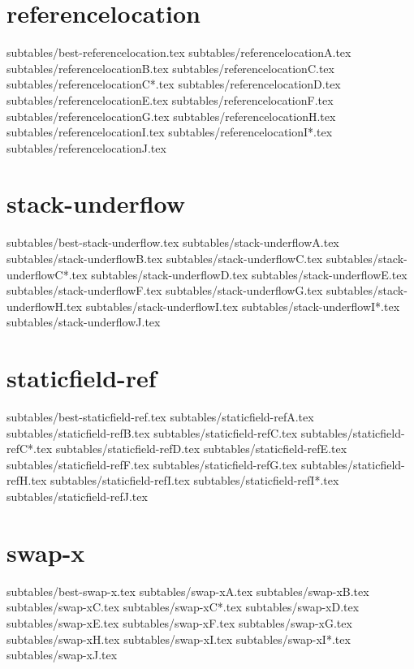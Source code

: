 \section{referencelocation}
    {subtables/best-referencelocation.tex}
    {subtables/referencelocationA.tex}
    {subtables/referencelocationB.tex}
    {subtables/referencelocationC.tex}
    {subtables/referencelocationC*.tex}
    {subtables/referencelocationD.tex}
    {subtables/referencelocationE.tex}
    {subtables/referencelocationF.tex}
    {subtables/referencelocationG.tex}
    {subtables/referencelocationH.tex}
    {subtables/referencelocationI.tex}
    {subtables/referencelocationI*.tex}
    {subtables/referencelocationJ.tex}
\newpage
\section{stack-underflow}
    {subtables/best-stack-underflow.tex}
    {subtables/stack-underflowA.tex}
    {subtables/stack-underflowB.tex}
    {subtables/stack-underflowC.tex}
    {subtables/stack-underflowC*.tex}
    {subtables/stack-underflowD.tex}
    {subtables/stack-underflowE.tex}
    {subtables/stack-underflowF.tex}
    {subtables/stack-underflowG.tex}
    {subtables/stack-underflowH.tex}
    {subtables/stack-underflowI.tex}
    {subtables/stack-underflowI*.tex}
    {subtables/stack-underflowJ.tex}
\newpage
\section{staticfield-ref}
    {subtables/best-staticfield-ref.tex}
    {subtables/staticfield-refA.tex}
    {subtables/staticfield-refB.tex}
    {subtables/staticfield-refC.tex}
    {subtables/staticfield-refC*.tex}
    {subtables/staticfield-refD.tex}
    {subtables/staticfield-refE.tex}
    {subtables/staticfield-refF.tex}
    {subtables/staticfield-refG.tex}
    {subtables/staticfield-refH.tex}
    {subtables/staticfield-refI.tex}
    {subtables/staticfield-refI*.tex}
    {subtables/staticfield-refJ.tex}
\newpage
\section{swap-x}
    {subtables/best-swap-x.tex}
    {subtables/swap-xA.tex}
    {subtables/swap-xB.tex}
    {subtables/swap-xC.tex}
    {subtables/swap-xC*.tex}
    {subtables/swap-xD.tex}
    {subtables/swap-xE.tex}
    {subtables/swap-xF.tex}
    {subtables/swap-xG.tex}
    {subtables/swap-xH.tex}
    {subtables/swap-xI.tex}
    {subtables/swap-xI*.tex}
    {subtables/swap-xJ.tex}
\newpage
